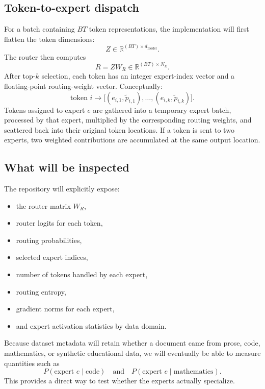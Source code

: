 \documentclass[11pt]{article}
\begin{document}
\subsection{Token-to-expert dispatch}
For a batch containing $B T$ token representations, the implementation will first
flatten the token dimensions:
\[
Z\in\mathbb{R}^{(BT)\times d_{\mathrm{model}}}.
\]
The router then computes
\[
R=ZW_R\in\mathbb{R}^{(BT)\times N_E}.
\]
After top-$k$ selection, each token has an integer expert-index vector and a
floating-point routing-weight vector. Conceptually:
\[
\text{token }i\longrightarrow
\big[(e_{i,1},\widetilde p_{i,1}),\ldots,(e_{i,k},\widetilde p_{i,k})\big].
\]
Tokens assigned to expert $e$ are gathered into a temporary expert batch, processed
by that expert, multiplied by the corresponding routing weights, and scattered
back into their original token locations. If a token is sent to two experts, two
weighted contributions are accumulated at the same output location.

\subsection{What will be inspected}
The repository will explicitly expose:
\begin{itemize}[leftmargin=1.5em]
    \item the router matrix $W_R$,
    \item router logits for each token,
    \item routing probabilities,
    \item selected expert indices,
    \item number of tokens handled by each expert,
    \item routing entropy,
    \item gradient norms for each expert,
    \item and expert activation statistics by data domain.
\end{itemize}
Because dataset metadata will retain whether a document came from prose, code,
mathematics, or synthetic educational data, we will eventually be able to measure
quantities such as
\[
P(\text{expert }e\mid\text{code})
\quad\text{and}\quad
P(\text{expert }e\mid\text{mathematics}).
\]
This provides a direct way to test whether the experts actually specialize.
\end{document}
